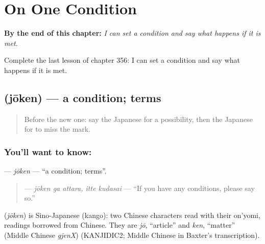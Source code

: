 
\chapter{On One Condition}
\label{ch:ja-on-one-condition}

\begin{chapteropening}
\textbf{By the end of this chapter:} \emph{I can set a condition and say what happens if it is met.}

Complete the last lesson of chapter 356: I can set a condition and say what happens if it is met.
\end{chapteropening}

\section[\texorpdfstring{\ja{じょうけん} (jōken)}{じょうけん (jōken)}]{ (jōken) — a condition; terms}

\label{lesson:JA-C356-jouken}



\begin{quote}
Before the new one: say the Japanese for a possibility, then the Japanese for to miss the mark.
\end{quote}

\subsection*{You'll want to know: }
\textbf{} — \emph{jōken} — \textquotedblleft{}a condition; terms\textquotedblright{}.

\begin{quote}
\textbf{  } — \emph{jōken ga attara, itte kudasai} — \textquotedblleft{}If you have any conditions, please say so.\textquotedblright{}
\end{quote}

\begin{cousinweb}
\textbf{} (\emph{jōken}) is Sino-Japanese (kango): two Chinese characters read with their on'yomi, readings borrowed from Chinese. They are \emph{jō}, \textquotedblleft{}article\textquotedblright{} and \emph{ken}, \textquotedblleft{}matter\textquotedblright{} (Middle Chinese \emph{gjenX}) (KANJIDIC2; Middle Chinese in Baxter's transcription).
\end{cousinweb}

